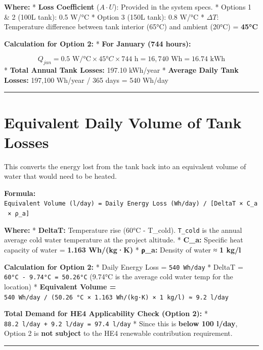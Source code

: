 \documentclass[
  10pt,
  letterpaper,
]{scrbook}
\begin{document}
\textbf{Where:} * \textbf{Loss Coefficient} (\(A \cdot U\)): Provided in
the system specs. * Options 1 \& 2 (100L tank): 0.5 W/°C * Option 3
(150L tank): 0.8 W/°C * \(\Delta T\): Temperature difference between
tank interior (65°C) and ambient (20°C) = \textbf{45°C}

\textbf{Calculation for Option 2:} * \textbf{For January (744 hours):}

\[Q_{jan} = 0.5 \text{ W/°C} \times 45°C \times 744 \text{ h} = 16{,}740 \text{ Wh} = 16.74 \text{ kWh}\]
* \textbf{Total Annual Tank Losses:} 197.10 kWh/year * \textbf{Average
Daily Tank Losses:} 197,100 Wh/year / 365 days = 540 Wh/day

\begin{center}\rule{0.5\linewidth}{0.5pt}\end{center}

\section{Equivalent Daily Volume of Tank
Losses}\label{equivalent-daily-volume-of-tank-losses}

This converts the energy lost from the tank back into an equivalent
volume of water that would need to be heated.

\textbf{Formula:}
\texttt{Equivalent\ Volume\ (l/day)\ =\ Daily\ Energy\ Loss\ (Wh/day)\ /\ {[}DeltaT\ ×\ C\_a\ ×\ ρ\_a{]}}

\textbf{Where:} * \textbf{DeltaT:} Temperature rise (60°C - T\_cold).
\texttt{T\_cold} is the annual average cold water temperature at the
project altitude. * \textbf{C\_a:} Specific heat capacity of water =
\textbf{1.163 Wh/(kg·K)} * \textbf{ρ\_a:} Density of water ≈ \textbf{1
kg/l}

\textbf{Calculation for Option 2:} * Daily Energy Loss =
\texttt{540\ Wh/day} * DeltaT = \texttt{60°C\ -\ 9.74°C\ =\ 50.26°C}
(9.74°C is the average cold water temp for the location) *
\textbf{Equivalent Volume =}
\texttt{540\ Wh/day\ /\ (50.26\ °C\ ×\ 1.163\ Wh/(kg·K)\ ×\ 1\ kg/l)\ ≈\ 9.2\ l/day}

\textbf{Total Demand for HE4 Applicability Check (Option 2):} *
\texttt{88.2\ l/day\ +\ 9.2\ l/day\ =\ 97.4\ l/day} * Since this is
\textbf{below 100 l/day}, Option 2 is \textbf{not subject} to the HE4
renewable contribution requirement.

\begin{center}\rule{0.5\linewidth}{0.5pt}\end{center}
\end{document}
